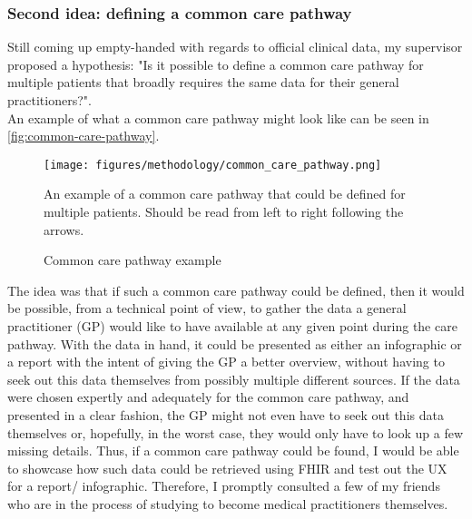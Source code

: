 \subsubsection*{Second idea: defining a common care pathway}
Still coming up empty-handed with regards to official clinical data, my supervisor proposed a hypothesis: "Is it possible to define a common care pathway for multiple patients that broadly requires the same data for their general practitioners?".
\\
An example of what a common care pathway might look like can be seen in \autoref{fig:common-care-pathway}.

\begin{figure}[H]
    \centering
    \texttt{[image: figures/methodology/common\_care\_pathway.png]}
    \caption{Common care pathway example}
    \medskip
    \small
    \raggedright
    An example of a common care pathway that could be defined for multiple patients. Should be read from left to right following the arrows.
    \label{fig:common-care-pathway}
\end{figure}

\noindent
The idea was that if such a common care pathway could be defined, then it would be possible, from a technical point of view, to gather the data a general practitioner (GP) would like to have available at any given point during the care pathway. With the data in hand, it could be presented as either an infographic or a report with the intent of giving the GP a better overview, without having to seek out this data themselves from possibly multiple different sources. If the data were chosen expertly and adequately for the common care pathway, and presented in a clear fashion, the GP might not even have to seek out this data themselves or, hopefully, in the worst case, they would only have to look up a few missing details. Thus, if a common care pathway could be found, I would be able to showcase how such data could be retrieved using FHIR and test out the UX for a report/ infographic. Therefore, I promptly consulted a few of my friends who are in the process of studying to become medical practitioners themselves. 

